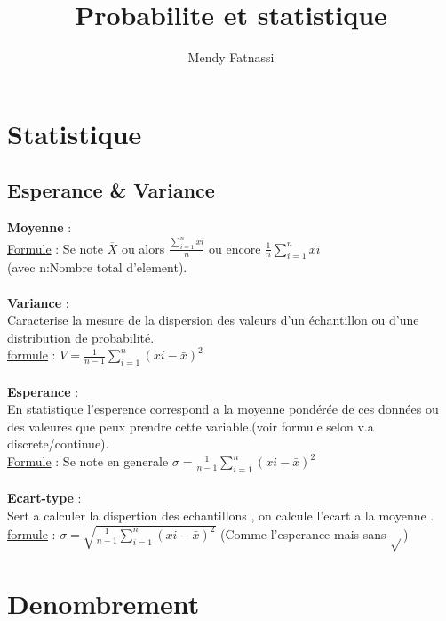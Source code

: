 \documentclass[a4paper,8pt,openany]{book}
\author{Mendy Fatnassi}
\title{Probabilite et statistique}
\begin{document}
\maketitle
\tableofcontents

\chapter{Statistique}

\section{Esperance \& Variance}

\textbf{Moyenne} : \\
\underline{Formule} : Se note $\overline{X}$ ou alors $\frac{\sum\limits_{i=1}^n xi}{n}$ ou encore $\frac{1}{n}\sum\limits_{i=1}^n xi$\\
(avec n:Nombre total d'element).\\
\\
\textbf{Variance} : \\
Caracterise la mesure de la dispersion des valeurs d'un échantillon ou d'une distribution de probabilité.\\
\underline{formule} : $V = \frac{1}{n-1}\sum\limits_{i=1}^n(xi-\bar{x})^2$\\
\\
\textbf{Esperance} : \\
En statistique l'esperence correspond a la moyenne pond\'er\'ee de ces donn\'ees ou des valeures que peux prendre cette variable.(voir formule selon v.a discrete/continue).\\
\underline{Formule} : Se note en generale $\sigma = \frac{1}{n-1}\sum\limits_{i=1}^n(xi-\bar{x})^2$ \\ 
\\
\textbf{Ecart-type} : \\
Sert a calculer la dispertion des echantillons , on calcule l'ecart a la moyenne .\\
\underline{formule} : $\sigma = \sqrt{\frac{1}{n-1}\sum\limits_{i=1}^n(xi-\bar{x})^2}$ (Comme l'esperance mais sans $\sqrt{}$)\\



\chapter{Denombrement}
\end{document}
